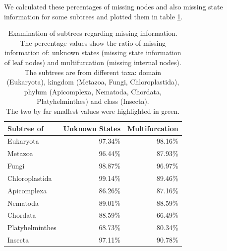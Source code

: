     We calculated these percentages of missing nodes and also missing state information for some 
      subtrees and plotted them in table \ref{table:percentage loss information subtrees}. \\
    \begin{table}[h!]
      \begin{center}
        \begin{tabular}{ |l||r|r| }
          \hline
          \bfseries Subtree of & \bfseries Unknown States & \bfseries Multifurcation \\ 
          \hline \hline
          Eukaryota       & 97.34\%  & 98.16\% \\
          \hline \hline
          Metazoa         & 96.44\%  & 87.93\% \\ \hline
          Fungi           & 98.87\%  & 96.97\% \\ \hline
          Chloroplastida  & 99.14\%  & 89.46\% \\
          \hline \hline            
          Apicomplexa     & 86.26\%  & 87.16\% \\ \hline
          Nematoda        & 89.01\%  & 88.59\% \\ \hline
          Chordata        & 88.59\%  & \cellcolor{green!50}66.49\% \\ \hline
          Platyhelminthes & \cellcolor{green!50}68.73\%  & 80.34\% \\
          \hline \hline            
          Insecta         & 97.11\%  & 90.78\% \\
          \hline  
        \end{tabular}
      \end{center}
      \caption{Examination of subtrees regarding missing information. \\
        The percentage values show the ratio of missing information of: unknown states (missing state 
          information of leaf nodes) and multifurcation (missing internal nodes). \\
        The subtrees are from different taxa: domain (Eukaryota), kingdom (Metazoa, Fungi, 
          Chloroplastida), phylum (Apicomplexa, Nematoda, Chordata, Platyhelminthes) and class 
          (Insecta). \\
        The two by far smallest values were highlighted in green.} 
      \label{table:percentage loss information subtrees} 
    \end{table}
    
